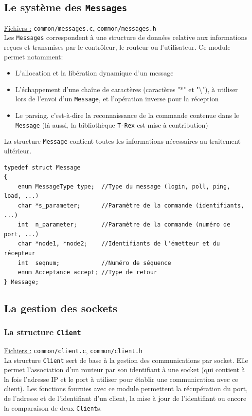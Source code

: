 \documentclass[a4paper,11pt]{article}
\begin{document}
\subsection{Le système des \texttt{Messages}}
\label{message}

\underline{Fichiers :} \texttt{common/messages.c}, \texttt{common/messages.h}\\

Les \texttt{Messages} correspondent à une structure de données relative aux informations reçues et transmises par le contrôleur, le routeur ou l'utilisateur. Ce module permet notamment:
\begin{itemize}
 \item L'allocation et la libération dynamique d'un message
 \item L'échappement d'une chaîne de caractères (caractères "*" et "\textbackslash"), à utiliser lors de l'envoi d'un \texttt{Message}, et l'opération inverse pour la réception
 \item Le parsing, c'est-à-dire la reconnaissance de la commande contenue dans le \texttt{Message} (là aussi, la bibliothèque \texttt{T-Rex} est mise à contribution)
\end{itemize}
La structure \texttt{Message} contient toutes les informations nécessaires au traitement ultérieur.

\begin{lstlisting}
typedef struct Message
{
	enum MessageType type;  //Type du message (login, poll, ping, load, ...)
	char *s_parameter;      //Paramètre de la commande (identifiants, ...)
	int  n_parameter;       //Paramètre de la commande (numéro de port, ...)
	char *node1, *node2;    //Identifiants de l'émetteur et du récepteur
	int  seqnum;            //Numéro de séquence
	enum Acceptance accept; //Type de retour
} Message;
\end{lstlisting}

\subsection{La gestion des sockets}

\subsubsection{La structure \texttt{Client}}

\underline{Fichiers :} \texttt{common/client.c}, \texttt{common/client.h}\\

La structure \texttt{Client} sert de base à la gestion des communications par socket. Elle permet l'association d'un routeur par son identifiant à une socket (qui contient à la fois l'adresse IP et le port à utiliser pour établir une communication avec ce client). Les fonctions fournies avec ce module permettent la récupération du port, de l'adresse et de l'identifiant d'un client, la mise à jour de l'identifiant ou encore la comparaison de deux \texttt{Client}s.
\end{document}
